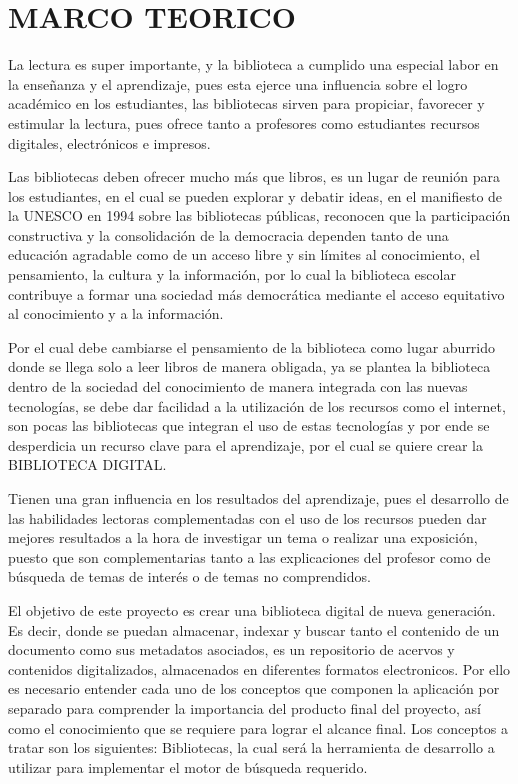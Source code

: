 \section{MARCO TEORICO} 

\begin{enumerate}[1.]
	
	La lectura es super importante, y la biblioteca a cumplido una especial labor en la enseñanza y el aprendizaje, pues esta ejerce una influencia sobre el logro académico en los estudiantes, las bibliotecas sirven para propiciar, favorecer y estimular la lectura, pues ofrece tanto a profesores como estudiantes recursos digitales, electrónicos e impresos. 
	
	Las bibliotecas deben ofrecer mucho más que libros, es un lugar de reunión para los estudiantes, en el cual se pueden explorar y debatir ideas, en el manifiesto de la UNESCO en 1994 sobre las bibliotecas públicas, reconocen que la participación constructiva y la consolidación de la democracia dependen tanto de una educación agradable como de un acceso libre y sin límites al conocimiento, el pensamiento, la cultura y la información, por lo cual la biblioteca escolar contribuye a formar una sociedad más democrática mediante el acceso equitativo al conocimiento y a la información.
	
	Por el cual debe cambiarse el pensamiento de la biblioteca como lugar aburrido donde se llega solo a leer libros de manera obligada, ya se plantea la biblioteca dentro de la sociedad del conocimiento de manera integrada con las nuevas tecnologías, se debe dar facilidad a la utilización de los recursos como el internet, son pocas las bibliotecas que integran el uso de estas tecnologías y por ende se desperdicia un recurso clave para el aprendizaje, por el cual se quiere crear la BIBLIOTECA DIGITAL.
	
	Tienen una gran influencia en los resultados del aprendizaje, pues el desarrollo de las habilidades lectoras complementadas con el uso de los recursos pueden dar mejores resultados a la hora de investigar un tema o realizar una exposición, puesto que son complementarias tanto a las explicaciones del profesor como de búsqueda de temas de interés o de temas no comprendidos. 
	
El objetivo de este proyecto es crear una biblioteca digital de nueva generación.
Es decir, donde se puedan almacenar, indexar y buscar tanto el contenido de un documento como sus metadatos asociados, es un repositorio de acervos y contenidos digitalizados, almacenados en diferentes formatos electronicos.
Por ello es necesario entender cada uno de los conceptos que componen la aplicación por separado para comprender la importancia 	del producto final del 	proyecto, así como el conocimiento que se requiere para lograr el alcance final.
Los conceptos a tratar son los siguientes: Bibliotecas, la cual será la	herramienta de desarrollo a utilizar para implementar el 	motor de búsqueda requerido. 


\end{enumerate} 
